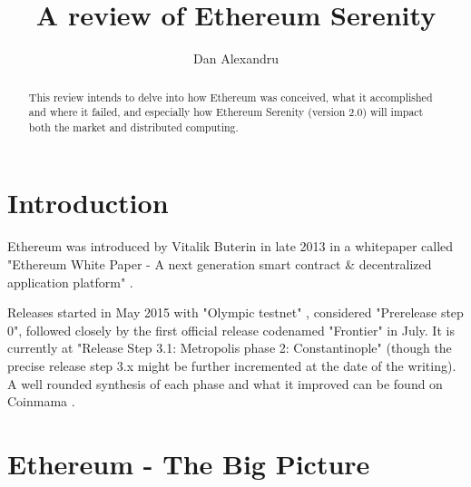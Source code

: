 \documentclass[runningheads]{llncs}
\begin{document}
%
\title{A review of Ethereum Serenity}
%
%
\author{Dan Alexandru}
%
%
%
\maketitle              %
%
\begin{abstract}
This review intends to delve into how Ethereum was conceived, what it accomplished and where it failed, and especially how Ethereum Serenity (version 2.0) will impact both the market and distributed computing.

\end{abstract}
%
%                           

\section{Introduction}

Ethereum was introduced by Vitalik Buterin in late 2013 in a whitepaper called "Ethereum White Paper - A next generation smart contract \& decentralized application platform" \cite{ETHwhitepaper}.


Releases started in May 2015 with "Olympic testnet" \cite{ETHreleases}, considered "Prerelease step 0", followed closely by the first official release codenamed "Frontier" in July. It is currently at "Release Step 3.1: Metropolis phase 2: Constantinople" (though the precise release step 3.x might be further incremented at the date of the writing). A well rounded synthesis of each phase and what it improved can be found on Coinmama \cite{CoinmamaETHhistory}.


\FloatBarrier
\section{Ethereum - The Big Picture}
\end{document}

